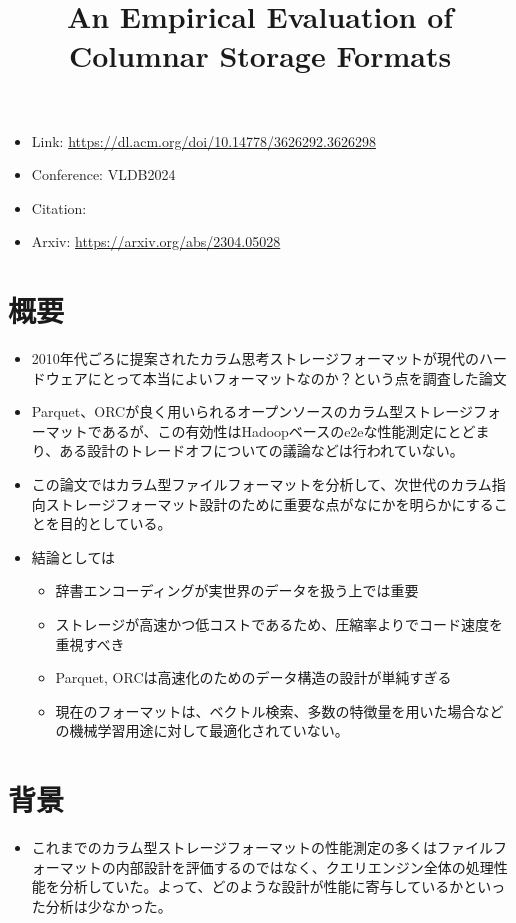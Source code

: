 \documentclass[uplatex]{jsarticle}
\title{An Empirical Evaluation of Columnar Storage Formats}
\author{\empty}
\date{\empty}
\theoremstyle{remark}
\begin{document}
\maketitle

\begin{itemize}
    \item Link: \url{https://dl.acm.org/doi/10.14778/3626292.3626298}
    \item Conference: VLDB2024
    \item Citation: \cite{columnar_storage_formats}
    \item Arxiv: \url{https://arxiv.org/abs/2304.05028}
\end{itemize}

\section{概要}
\begin{itemize}
  \item 2010年代ごろに提案されたカラム思考ストレージフォーマットが現代のハードウェアにとって本当によいフォーマットなのか？という点を調査した論文
  \item Parquet、ORCが良く用いられるオープンソースのカラム型ストレージフォーマットであるが、この有効性はHadoopベースのe2eな性能測定にとどまり、ある設計のトレードオフについての議論などは行われていない。
  \item この論文ではカラム型ファイルフォーマットを分析して、次世代のカラム指向ストレージフォーマット設計のために重要な点がなにかを明らかにすることを目的としている。
  \item 結論としては
  \begin{itemize}
    \item 辞書エンコーディングが実世界のデータを扱う上では重要
    \item ストレージが高速かつ低コストであるため、圧縮率よりでコード速度を重視すべき
    \item Parquet, ORCは高速化のためのデータ構造の設計が単純すぎる
    \item 現在のフォーマットは、ベクトル検索、多数の特徴量を用いた場合などの機械学習用途に対して最適化されていない。
  \end{itemize}
\end{itemize}

\section{背景}
\begin{itemize}
  \item これまでのカラム型ストレージフォーマットの性能測定の多くはファイルフォーマットの内部設計を評価するのではなく、クエリエンジン全体の処理性能を分析していた。よって、どのような設計が性能に寄与しているかといった分析は少なかった。
\end{itemize}
\end{document}
